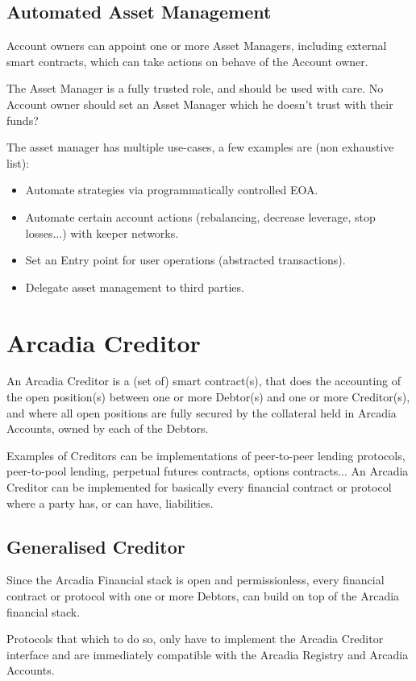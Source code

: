 \documentclass[sigconf,nonacm]{acmart}
\begin{document}
\subsection{Automated Asset Management}
Account owners can appoint one or more Asset Managers, including external smart contracts, which can take actions on behave of the Account owner.

The Asset Manager is a fully trusted role, and should be used with care.
No Account owner should set an Asset Manager which he doesn’t trust with their funds?

The asset manager has multiple use-cases, a few examples are (non exhaustive list):
\begin{itemize}
    \item Automate strategies via programmatically controlled EOA.
    \item Automate certain account actions (rebalancing, decrease leverage, stop losses...) with keeper networks.
    \item Set an Entry point for user operations (abstracted transactions).
    \item Delegate asset management to third parties.
\end{itemize}

\section{Arcadia Creditor}
\label{sec:arcadia-creditor}
An Arcadia Creditor is a (set of) smart contract(s),
that does the accounting of the open position(s) between one or more Debtor(s) and one or more Creditor(s),
and where all open positions are fully secured by the collateral held in Arcadia Accounts,
owned by each of the Debtors.

Examples of Creditors can be implementations of peer-to-peer lending protocols, peer-to-pool lending, perpetual futures contracts, options contracts...
An Arcadia Creditor can be implemented for basically every financial contract or protocol where a party has, or can have, liabilities.

\subsection{Generalised Creditor}
Since the Arcadia Financial stack is open and permissionless,
every financial contract or protocol with one or more Debtors,
can build on top of the Arcadia financial stack.

Protocols that which to do so, only have to implement the Arcadia Creditor interface
and are immediately compatible with the Arcadia Registry and Arcadia Accounts.
\end{document}
